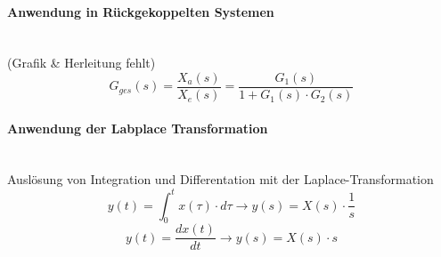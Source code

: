 \documentclass{article}
\begin{document}
\paragraph{Anwendung in Rückgekoppelten Systemen} \mbox{} \\
(Grafik \& Herleitung fehlt)
\[ G_{ges}(s) = \frac{X_a(s)}{X_e(s)} = \frac{G_1(s)}{1+ G_1(s) \cdot G_2(s)} \]

\paragraph{Anwendung der Labplace Transformation} \mbox{} \\
Auslösung von Integration und Differentation mit der Laplace-Transformation \\
\[ y(t) = \int_{0}^{t} x(\tau) \cdot d\tau \to y(s) = X(s) \cdot \frac{1}{s} \]
\[ y(t) = \frac{dx(t)}{dt} \to y(s) = X(s) \cdot s \]
\end{document}
